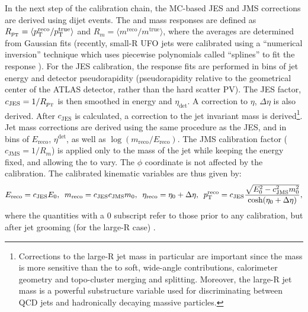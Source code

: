 In the next step of the calibration chain, the MC-based JES and JMS corrections are derived using dijet events. The \pt and mass responses are defined as $R_{p_{\text{T}}}=\langle p_{\text{T}}^{\text{reco}}/p_{\text{T}}^{\text{true}}\rangle$ and $R_{m}=\langle m^{\text{reco}}/m^{\text{true}}\rangle$, where the averages are determined from Gaussian fits (recently, small-R UFO jets were calibrated using a ``numerical inversion'' technique which uses piecewise polynomials called ``splines'' to fit the response \cite{Atlas:smallrufo}). For the JES calibration, the response fits are performed in bins of jet energy and detector pseudorapidity (pseudorapidity relative to the geometrical center of the ATLAS detector, rather than the hard scatter PV). The JES factor, $c_{\text{JES}}=1/R_{p_{\text{T}}}$ is then smoothed in energy and $\eta_{\text{det}}$. A correction to $\eta$, $\Delta\eta$ is also derived. After $c_{\text{JES}}$ is calculated, a correction to the jet invariant mass is derived\footnote{Corrections to the large-R jet mass in particular are important since the mass is more sensitive than the \pt to soft, wide-angle contributions, calorimeter geometry and topo-cluster merging and splitting. Moreover, the large-R jet mass is a powerful substructure variable used for discriminating between QCD jets and hadronically decaying massive particles.}. Jet mass corrections are derived using the same procedure as the JES, and in bins of $E_{\text{reco}}$, $\eta^\text{det}$, as well as $\log(m_{\text{reco}}/E_{\text{reco}})$. The JMS calibration factor ($c_{\text{JMS}}=1/R_m$) is applied only to the mass of the jet while keeping the energy fixed, and allowing the \pt to vary.  The $\phi$  coordinate is not affected by the calibration. The calibrated kinematic variables are thus given by: 
\begin{equation}
    E_{\text{reco}}=c_{\text{JES}}E_0,\hspace{5pt}m_{\text{reco}}=c_{\text{JES}}c_{\text{JMS}}m_0,\hspace{5pt}\eta_{\text{reco}}=\eta_0+\Delta\eta,\hspace{5pt}p_{\text{T}}^{\text{reco}}=c_{\text{JES}}\frac{\sqrt{E_0^2-c_{\text{JMS}}^2m_0^2}}{\cosh(\eta_0+\Delta\eta)},
\end{equation}
where the quantities with a 0 subscript refer to those prior to any calibration, but after jet grooming (for the large-R case) \cite{Atlas:largercali,Atlas:Schramm}.

